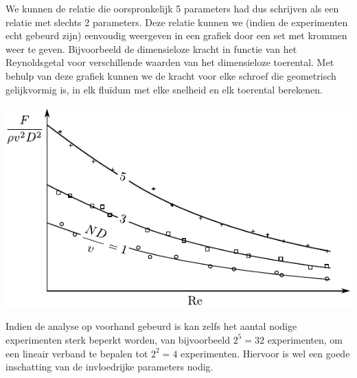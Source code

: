 \begin{voorbeeld}
	We kunnen de relatie die oorspronkelijk 5 parameters had dus schrijven als een relatie met slechts 2 parameters. Deze relatie kunnen we (indien de experimenten echt gebeurd zijn) eenvoudig weergeven in een grafiek door een set met krommen weer te geven. Bijvoorbeeld de dimensieloze kracht in functie van het Reynoldsgetal voor verschillende waarden van het dimensieloze toerental. Met behulp van deze grafiek kunnen we de kracht voor elke schroef die geometrisch gelijkvormig is, in elk fluïdum met elke snelheid en elk toerental berekenen.
	\begin{center}
		\includegraphics{fig/gelijkvormigheid/dimensieanalysevoorbeeld}
	\end{center}	
	Indien de analyse op voorhand gebeurd is kan zelfs het aantal nodige experimenten sterk beperkt worden, van bijvoorbeeld $2^5=32$ experimenten, om een lineair verband te bepalen tot $2^2=4$ experimenten. Hiervoor is wel een goede inschatting van de invloedrijke parameters nodig.

\end{voorbeeld}